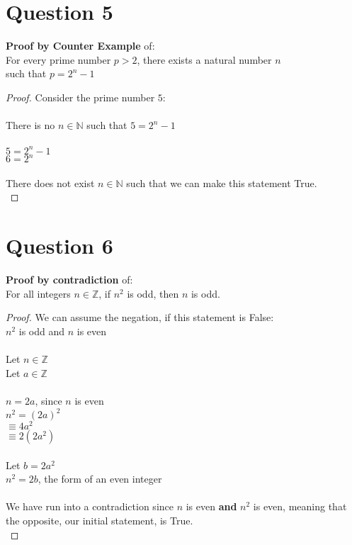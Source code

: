\documentclass{article}
\begin{document}
    \newpage
    \section*{Question 5}
    \textbf{Proof by Counter Example} of: \\
    \indent For every prime number $p > 2$, there exists a natural number $n$\\ \indent such that $p = 2^n - 1$ 
    \begin{proof}
    Consider the prime number $5$: \\ \\
    \indent There is no $n \in \mathbb{N}$ such that $5 = 2^n -1$ \\ \\
    \indent $5 = 2^n - 1$ \\
    \indent $6 = 2^n$ \\ \\
    There does not exist $n \in \mathbb{N}$ such that we can make this statement True. \\ \end{proof}
    \newpage
    \section*{Question 6}
    \textbf{Proof by contradiction} of: \\
    \indent For all integers $n \in \mathbb{Z}$, if $n^2$ is odd, then $n$ is odd. 
    \begin{proof}
    We can assume the negation, if this statement is False:\\
    \indent $n^2$ is odd and $n$ is even \\ \\
    Let $n \in \mathbb{Z}$ \\
    Let $a \in \mathbb{Z}$ \\ \\
    $n = 2a$, since $n$ is even \\
    $n^2 = (2a)^2$ \\
    $\equiv 4a^2$ \\ 
    $\equiv 2(2a^2)$ \\  \\
    Let $b = 2a^2$ \\
    $n^2 = 2b$, the form of an even integer \\ \\
    We have run into a contradiction since $n$ is even \textbf{and} $n^2$ is even, meaning that the opposite, our initial statement, is True. \\ \end{proof}
    
  

   
\end{document}

